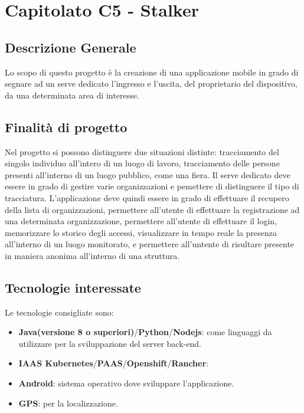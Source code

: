\section{Capitolato C5 - Stalker}
\subsection{Descrizione Generale}
Lo scopo di questo progetto è la creazione di una applicazione mobile in grado di segnare ad un serve dedicato l'ingresso  e l'uscita, del proprietario del dispositivo, da una determinata area di interesse.
\subsection{Finalità di progetto}%
Nel progetto si possono distinguere due situazioni distinte: tracciamento del singolo individuo all'intero di un luogo di lavoro, tracciamento delle persone presenti all'interno di un luogo pubblico, come una fiera. Il serve dedicato deve essere in grado di gestire varie organizzazioni e pemettere di distinguere il tipo di tracciatura. L'applicazione deve quindi essere in grado di effettuare il recupero della lista di organizzazioni, permettere all'utente di effettuare la registrazione ad una determinata organizzazione, permettere all'utente di effettuare il login, memorizzare lo storico degli accessi, visualizzare in tempo reale la presenza all'interno di un luogo monitorato, e permettere all'untente di risultare presente in maniera anonima all'interno di una struttura.
\subsection{Tecnologie interessate}
Le tecnologie consigliate sono:
\begin{itemize} %
	\item \textbf{Java(versione 8 o superiori)}/\textbf{Python}/\textbf{Nodejs}: come linguaggi da utilizzare per la sviluppazione del server back-end.
	\item \textbf{IAAS Kubernetes}/\textbf{PAAS}/\textbf{Openshift}/\textbf{Rancher}:
	\item \textbf{Android}: sistema operativo dove sviluppare l'applicazione.
	\item \textbf{GPS}: per la localizzazione.
\end{itemize}
